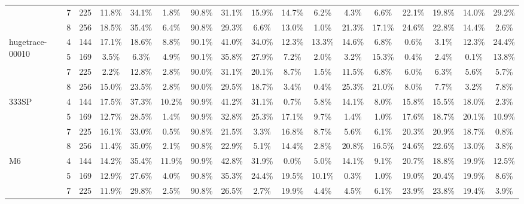 \begin{tabular}[c]{| l | c | c | c | c | c | c | c | c | c | c | c | c | c | c | c | c |}
 & 7 & 225 & 11.8\%  & 34.1\%  & 1.8\%  & 90.8\%  & 31.1\%  & 15.9\%  & 14.7\%  & 6.2\%  & 4.3\%  & 6.6\%  & 22.1\%  & 19.8\%  & 14.0\%  & 29.2\%   \\ \cline{2-17}
 & 8 & 256 & 18.5\%  & 35.4\%  & 6.4\%  & 90.8\%  & 29.3\%  & 6.6\%  & 13.0\%  & 1.0\%  & 21.3\%  & 17.1\%  & 24.6\%  & 22.8\%  & 14.4\%  & 2.6\%   \\ \hline
\multirow{4}{*}{hugetrace-00010}  & 4 & 144 & 17.1\%  & 18.6\%  & 8.8\%  & 90.1\%  & 41.0\%  & 34.0\%  & 12.3\%  & 13.3\%  & 14.6\%  & 6.8\%  & 0.6\%  & 3.1\%  & 12.3\%  & 24.4\%   \\ \cline{2-17}
 & 5 & 169 & 3.5\%  & 6.3\%  & 4.9\%  & 90.1\%  & 35.8\%  & 27.9\%  & 7.2\%  & 2.0\%  & 3.2\%  & 15.3\%  & 0.4\%  & 2.4\%  & 0.1\%  & 13.8\%   \\ \cline{2-17}
 & 7 & 225 & 2.2\%  & 12.8\%  & 2.8\%  & 90.0\%  & 31.1\%  & 20.1\%  & 8.7\%  & 1.5\%  & 11.5\%  & 6.8\%  & 6.0\%  & 6.3\%  & 5.6\%  & 5.7\%   \\ \cline{2-17}
 & 8 & 256 & 15.0\%  & 23.5\%  & 2.8\%  & 90.0\%  & 29.5\%  & 18.7\%  & 3.4\%  & 0.4\%  & 25.3\%  & 21.0\%  & 8.0\%  & 7.7\%  & 3.2\%  & 7.8\%   \\ \hline
\multirow{4}{*}{333SP}  & 4 & 144 & 17.5\%  & 37.3\%  & 10.2\%  & 90.9\%  & 41.2\%  & 31.1\%  & 0.7\%  & 5.8\%  & 14.1\%  & 8.0\%  & 15.8\%  & 15.5\%  & 18.0\%  & 2.3\%   \\ \cline{2-17}
 & 5 & 169 & 12.7\%  & 28.5\%  & 1.4\%  & 90.9\%  & 32.8\%  & 25.3\%  & 17.1\%  & 9.7\%  & 1.4\%  & 1.0\%  & 17.6\%  & 18.7\%  & 20.1\%  & 10.9\%   \\ \cline{2-17}
 & 7 & 225 & 16.1\%  & 33.0\%  & 0.5\%  & 90.8\%  & 21.5\%  & 3.3\%  & 16.8\%  & 8.7\%  & 5.6\%  & 6.1\%  & 20.3\%  & 20.9\%  & 18.7\%  & 0.8\%   \\ \cline{2-17}
 & 8 & 256 & 11.4\%  & 35.0\%  & 2.1\%  & 90.8\%  & 22.9\%  & 5.1\%  & 14.4\%  & 2.8\%  & 20.8\%  & 16.5\%  & 24.6\%  & 22.6\%  & 13.0\%  & 3.8\%   \\ \hline
\multirow{4}{*}{M6}  & 4 & 144 & 14.2\%  & 35.4\%  & 11.9\%  & 90.9\%  & 42.8\%  & 31.9\%  & 0.0\%  & 5.0\%  & 14.1\%  & 9.1\%  & 20.7\%  & 18.8\%  & 19.9\%  & 12.5\%   \\ \cline{2-17}
 & 5 & 169 & 12.9\%  & 27.6\%  & 4.0\%  & 90.8\%  & 35.3\%  & 24.4\%  & 19.5\%  & 10.1\%  & 0.3\%  & 1.0\%  & 19.0\%  & 20.4\%  & 19.9\%  & 8.6\%   \\ \cline{2-17}
 & 7 & 225 & 11.9\%  & 29.8\%  & 2.5\%  & 90.8\%  & 26.5\%  & 2.7\%  & 19.9\%  & 4.4\%  & 4.5\%  & 6.1\%  & 23.9\%  & 23.8\%  & 19.4\%  & 3.9\%   \\ \cline{2-17}

\end{tabular}
